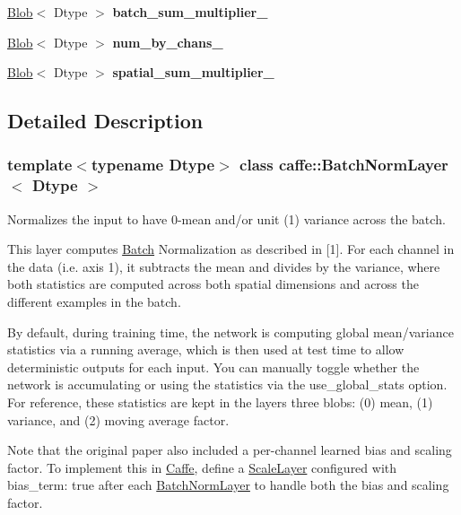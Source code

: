 \begin{DoxyCompactItemize}
\mbox{\hyperlink{classcaffe_1_1_blob}{Blob}}$<$ Dtype $>$ {\bfseries batch\+\_\+sum\+\_\+multiplier\+\_\+}
\item 
\mbox{\label{classcaffe_1_1_batch_norm_layer_a2076517e86801dd17ccf48392602278a}} 
\mbox{\hyperlink{classcaffe_1_1_blob}{Blob}}$<$ Dtype $>$ {\bfseries num\+\_\+by\+\_\+chans\+\_\+}
\item 
\mbox{\label{classcaffe_1_1_batch_norm_layer_a164f15a0e6882b230465615085d7c987}} 
\mbox{\hyperlink{classcaffe_1_1_blob}{Blob}}$<$ Dtype $>$ {\bfseries spatial\+\_\+sum\+\_\+multiplier\+\_\+}
\end{DoxyCompactItemize}


\subsection{Detailed Description}
\subsubsection*{template$<$typename Dtype$>$\newline
class caffe\+::\+Batch\+Norm\+Layer$<$ Dtype $>$}

Normalizes the input to have 0-\/mean and/or unit (1) variance across the batch. 

This layer computes \mbox{\hyperlink{classcaffe_1_1_batch}{Batch}} Normalization as described in \mbox{[}1\mbox{]}. For each channel in the data (i.\+e. axis 1), it subtracts the mean and divides by the variance, where both statistics are computed across both spatial dimensions and across the different examples in the batch.

By default, during training time, the network is computing global mean/variance statistics via a running average, which is then used at test time to allow deterministic outputs for each input. You can manually toggle whether the network is accumulating or using the statistics via the use\+\_\+global\+\_\+stats option. For reference, these statistics are kept in the layer\textquotesingle{}s three blobs\+: (0) mean, (1) variance, and (2) moving average factor.

Note that the original paper also included a per-\/channel learned bias and scaling factor. To implement this in \mbox{\hyperlink{classcaffe_1_1_caffe}{Caffe}}, define a {\ttfamily \mbox{\hyperlink{classcaffe_1_1_scale_layer}{Scale\+Layer}}} configured with {\ttfamily bias\+\_\+term\+: true} after each {\ttfamily \mbox{\hyperlink{classcaffe_1_1_batch_norm_layer}{Batch\+Norm\+Layer}}} to handle both the bias and scaling factor.

